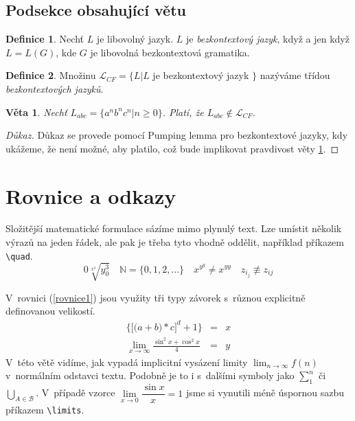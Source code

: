 \documentclass[11pt,a4paper,twocolumn]{article}
\theoremstyle{definition}
\newtheorem{definice}{Definice}[section]
\theoremstyle{plain}
\theoremstyle{plain}
\newtheorem{veta}{Věta}
\begin{document}
\subsection{Podsekce obsahující větu}
\begin{definice}
Nechť $ L $ je libovolný jazyk. $ L $ je \textit{bezkontextový jazyk}, když a jen když $ L = L(G) $, kde $ G $ je libovolná bezkontextová gramatika.
\end{definice}
\begin{definice}
Množinu $ \mathcal{L}_{CF} = \lbrace L\vert L $ je bezkontextový jazyk $ \rbrace $ nazýváme třídou \textit{bezkontextových jazyků}.
\end{definice}
\begin{veta}\label{veta1}
Nechť $ L_{abc} = \lbrace a^{n}b^{n}c^{n}\vert n\geq 0 \rbrace $. Platí, že $ L_{abc} \notin \mathcal{L}_{CF} $.
\end{veta}
\begin{proof}[Důkaz]
Důkaz se provede pomocí Pumping lemma pro bezkontextové jazyky, kdy ukážeme, že není možné, aby platilo, což bude implikovat pravdivost věty \ref{veta1}.
\end{proof}

\section{Rovnice a odkazy}

Složitější matematické formulace sázíme mimo plynulý text. Lze umístit několik výrazů na jeden řádek, ale pak je třeba tyto vhodně oddělit, například příkazem \verb;\quad;. 
\begin{equation*}{0}
\sqrt[x^{2}]{y^{3}_{0}} \quad \mathbb{N} = \lbrace 0,1,2,\ldots\rbrace \quad x^{y^{y}} \neq x^{yy} \quad z_{i_{j}} \not\equiv z_{ij} 
\end{equation*}

V~rovnici (\ref{rovnice1}) jsou využity tři typy závorek s~různou explicitně definovanou velikostí.
\begin{eqnarray}\label{rovnice1}
\bigg\lbrace \Big[ \big(a+b\big)*c\Big]^{d} +1\bigg\rbrace &=& x  \\
\lim_{x\to\infty}\frac{\sin^{2}{x} + \cos^{2}{x}}{4} &=& y \nonumber
\end{eqnarray}
V~této větě vidíme, jak vypadá implicitní vysázení limity $ \lim_{n\to\infty} f(n) $ v~normálním odstavci textu. Podobně je to i s~dalšími symboly jako $ \sum^{n}_{1} $ či $ \bigcup_{A\in\mathcal{B}} $. V~případě vzorce  $ \lim\limits_{x\to 0} \dfrac{\sin{x}}{x} = 1 $ jsme si vynutili méně úspornou sazbu příkazem \verb;\limits;.
\end{document}
